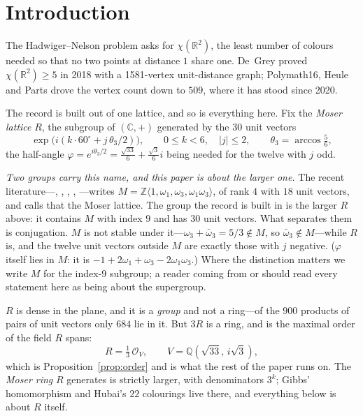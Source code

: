 \documentclass[11pt,reqno]{amsart}
\theoremstyle{plain}
\theoremstyle{definition}
\newcommand{\Z}{\mathbb{Z}}
\newcommand{\Q}{\mathbb{Q}}
\newcommand{\R}{\mathbb{R}}
\newcommand{\C}{\mathbb{C}}
\newcommand{\Lat}{R}
\newcommand{\Ok}{\mathcal{O}}
\begin{document}
\maketitle

\section{Introduction}\label{sec:intro}

The Hadwiger--Nelson problem asks for $\chi(\R^2)$, the least number of colours
needed so that no two points at distance $1$ share one. De~Grey \cite{deGrey}
proved $\chi(\R^2) \ge 5$ in 2018 with a 1581-vertex unit-distance graph;
Polymath16, Heule \cite{Heule} and Parts \cite{Parts} drove the vertex count down
to $509$, where it has stood since 2020.

The record is built out of one lattice, and so is everything here. Fix the
\emph{Moser lattice} $\Lat$, the subgroup of $(\C,+)$ generated by the $30$ unit
vectors
\[
  \exp\!\big(i(k\cdot 60^\circ + j\,\theta_3/2)\big),
  \qquad 0 \le k < 6, \quad \lvert j\rvert \le 2,
  \qquad \theta_3 = \arccos\tfrac56,
\]
the half-angle $\varphi = e^{i\theta_3/2} = \tfrac{\sqrt{33}}{6} +
\tfrac{\sqrt3}{6}i$ being needed for the twelve with $j$ odd.

\emph{Two groups carry this name, and this paper is about the larger one.} The
recent literature---\cite{Engel}, \cite{Ruhland}, \cite{Ducz},
\cite{Matolcsi}, \cite{DuczVarga}---writes
$M = \Z\langle 1, \omega_1, \omega_3, \omega_1\omega_3 \rangle$, of rank $4$
with $18$ unit vectors, and calls that the Moser lattice. The group the record
is built in is the larger $\Lat$ above: it contains $M$ with index $9$ and has
$30$ unit vectors. What separates them is conjugation. $M$ is not stable under
it---$\omega_3 + \bar\omega_3 = 5/3 \notin M$, so $\bar\omega_3 \notin M$---while
$\Lat$ is, and the twelve unit vectors outside $M$ are exactly those with $j$
negative. ($\varphi$ itself lies in $M$: it is
$-1 + 2\omega_1 + \omega_3 - 2\omega_1\omega_3$.) Where the distinction matters we write $M$ for
the index-$9$ subgroup; a reader coming from \cite{Engel} or \cite{Ruhland}
should read every statement here as being about the supergroup.

$\Lat$ is dense in the plane, and it is a \emph{group} and not a ring---of the
$900$ products of pairs of unit vectors only $684$ lie in it.
But $3\Lat$ is a ring, and is the maximal order of the field $\Lat$ spans:
\[
  \Lat = \tfrac13\,\Ok_V, \qquad V = \Q(\sqrt{33},\, i\sqrt3),
\]
which is Proposition~\ref{prop:order} and is what the rest of the paper runs on.
The \emph{Moser ring} $\Lat$ generates is strictly larger, with denominators
$3^k$; Gibbs' homomorphism and Hubai's $22$ colourings \cite{Hubai} live there,
and everything below is about $\Lat$ itself.
\end{document}
